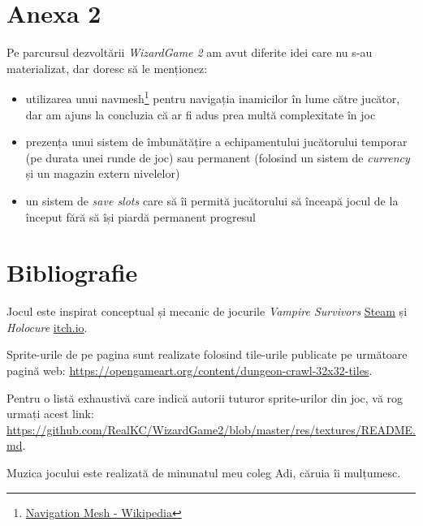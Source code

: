 \documentclass{article}
\begin{document}
    \section*{Anexa 2}
    Pe parcursul dezvoltării \emph{WizardGame 2} am avut diferite idei care nu s-au materializat,
    dar doresc să le menționez:
    \begin{itemize}
        \item utilizarea unui navmesh\footnote{\href{https://en.wikipedia.org/wiki/Navigation_mesh}{Navigation Mesh - Wikipedia}}
        pentru navigația inamicilor în lume către jucător, dar am ajuns la concluzia că ar fi adus
        prea multă complexitate în joc
        \item prezența unui sistem de îmbunătățire a echipamentului jucătorului temporar (pe durata
        unei runde de joc) sau permanent (folosind un sistem de \emph{currency} și un magazin extern
        nivelelor)
        \item un sistem de \emph{save slots} care să îi permită jucătorului să înceapă jocul de la
        început fără să își piardă permanent progresul
    \end{itemize}

    \section*{Bibliografie}
    Jocul este inspirat conceptual și mecanic de jocurile \emph{Vampire Survivors}
    \href{https://store.steampowered.com/app/1794680/Vampire_Survivors/}{Steam} și
    \emph{Holocure} \href{https://kay-yu.itch.io/holocure}{itch.io}.

    Sprite-urile de pe pagina \pageref{sec:sprites} sunt realizate folosind tile-urile publicate
    pe următoare pagină web: \url{https://opengameart.org/content/dungeon-crawl-32x32-tiles}.

    Pentru o listă exhaustivă care indică autorii tuturor sprite-urilor din joc, vă rog urmați
    acest link: \url{https://github.com/RealKC/WizardGame2/blob/master/res/textures/README.md}.

    Muzica jocului este realizată de minunatul meu coleg Adi, căruia îi mulțumesc.
\end{document}
